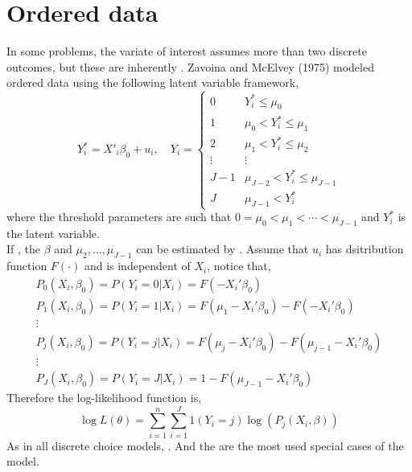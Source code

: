 \ChapterHeading

\section{Ordered data}
In some problems, the variate of interest assumes more than two discrete outcomes, but these are inherently .
Zavoina and McElvey (1975) modeled ordered data using the following latent variable framework,
\begin{equation}
    Y^*_i = X'_i\beta_0+u_i, \quad Y_i = \begin{cases}
        0 & Y_i^*\leq \mu_0\\
        1 & \mu_0<Y_i^*\leq\mu_1\\
        2 & \mu_1<Y_i^*\leq\mu_2\\
        \vdots & \vdots\\
        J-1 & \mu_{J-2}<Y_i^*\leq\mu_{J-1}\\
        J & \mu_{J-1}<Y_i^*
    \end{cases}
\end{equation}
where the threshold parameters are such that $0=\mu_0<\mu_1<\cdots<\mu_{J-1}$ and $Y_i^*$ is the latent variable.\\

If , the  $\beta$ and $\mu_2,\ldots,\mu_{J-1}$ can be estimated by .
Assume that $u_i$ has dsitribution function $F(\cdot)$ and is independent of $X_i$, notice that,
\begin{gather*}
    P_0(X_i,\beta_0) = P(Y_i=0|X_i) = F(-X_i'\beta_0)\\
    P_1(X_i,\beta_0) = P(Y_i=1|X_i) = F(\mu_1-X_i'\beta_0) - F(-X_i'\beta_0)\\
    \vdots\\
    P_j(X_i,\beta_0) = P(Y_i=j|X_i) = F(\mu_j-X_i'\beta_0) - F(\mu_{j-1}-X_i'\beta_0)\\
    \vdots\\
    P_J(X_i,\beta_0) = P(Y_i=J|X_i) = 1 - F(\mu_{J-1}-X_i'\beta_0)
\end{gather*}
Therefore the log-likelihood function is,
\begin{equation*}
    \log L(\theta) = \sum_{i=1}^{n}\sum_{i=1}^{J}1(Y_i=j)\log(P_j(X_i,\beta))
\end{equation*}
As in all discrete choice models, .
And the  are the most used special cases of the model.\\

